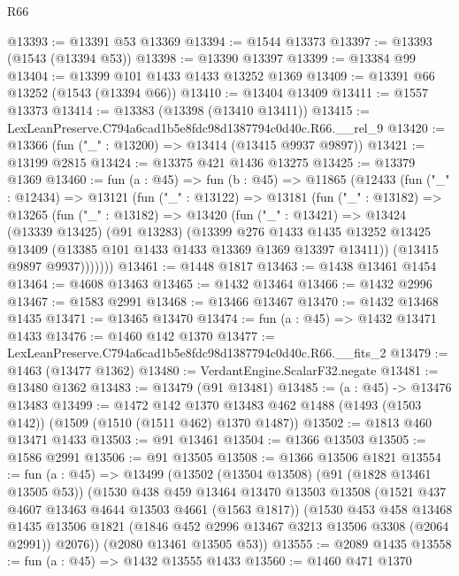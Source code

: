 \begin{lexlean}{R66}
\begin{coremodule}
@13393 := @13391 @53 @13369
@13394 := @1544 @13373
@13397 := @13393 (@1543 (@13394 @53))
@13398 := @13390 @13397
@13399 := @13384 @99
@13404 := @13399 @101 @1433 @1433 @13252 @1369
@13409 := @13391 @66 @13252 (@1543 (@13394 @66))
@13410 := @13404 @13409
@13411 := @1557 @13373
@13414 := @13383 (@13398 (@13410 @13411))
@13415 := LexLeanPreserve.C794a6cad1b5e8fdc98d1387794c0d40c.R66.__rel_9
@13420 := @13366 (fun ("_" : @13200) => @13414 (@13415 @9937 @9897))
@13421 := @13199 @2815
@13424 := @13375 @421 @1436 @13275
@13425 := @13379 @1369
@13460 := fun (a : @45) =>
  fun (b : @45) =>
  @11865
    (@12433
      (fun ("_" : @12434) =>
      @13121
        (fun ("_" : @13122) =>
        @13181
          (fun ("_" : @13182) =>
          @13265
            (fun ("_" : @13182) =>
            @13420
              (fun ("_" : @13421) =>
              @13424
                (@13339 @13425)
                (@91 @13283)
                (@13399
                  @276
                  @1433
                  @1435
                  @13252
                  @13425
                  @13409
                  (@13385 @101 @1433 @1433 @13369 @1369 @13397 @13411))
                (@13415 @9897 @9937)))))))
@13461 := @1448 @1817
@13463 := @1438 @13461 @1454
@13464 := @4608 @13463
@13465 := @1432 @13464
@13466 := @1432 @2996
@13467 := @1583 @2991
@13468 := @13466 @13467
@13470 := @1432 @13468 @1435
@13471 := @13465 @13470
@13474 := fun (a : @45) => @1432 @13471 @1433
@13476 := @1460 @142 @1370
@13477 := LexLeanPreserve.C794a6cad1b5e8fdc98d1387794c0d40c.R66.__fits_2
@13479 := @1463 (@13477 @1362)
@13480 := VerdantEngine.ScalarF32.negate
@13481 := @13480 @1362
@13483 := @13479 (@91 @13481)
@13485 := (a : @45) -> @13476 @13483
@13499 := @1472
    @142
    @1370
    @13483
    @462
    @1488
    (@1493 (@1503 @142))
    (@1509 (@1510 (@1511 @462) @1370 @1487))
@13502 := @1813 @460 @13471 @1433
@13503 := @91 @13461
@13504 := @1366 @13503
@13505 := @1586 @2991
@13506 := @91 @13505
@13508 := @1366 @13506 @1821
@13554 := fun (a : @45) =>
  @13499
    (@13502
      (@13504 @13508)
      (@91 (@1828 @13461 @13505 @53))
      (@1530
        @438
        @459
        @13464
        @13470
        @13503
        @13508
        (@1521 @437 @4607 @13463 @4644 @13503 @4661 (@1563 @1817))
        (@1530
          @453
          @458
          @13468
          @1435
          @13506
          @1821
          (@1846 @452 @2996 @13467 @3213 @13506 @3308 (@2064 @2991))
          @2076))
      (@2080 @13461 @13505 @53))
@13555 := @2089 @1435
@13558 := fun (a : @45) => @1432 @13555 @1433
@13560 := @1460 @471 @1370

\end{coremodule}
\end{lexlean}
